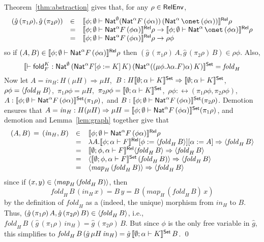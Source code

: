 \documentclass{lmcs}
\theoremstyle{plain}\newtheorem{satz}[thm]{Satz}
\newcommand{\fold}{\mathsf{fold}}
\begin{document}
{\proof
Theorem~\ref{thm:abstraction} gives that, for any 
$\rho \in \mathsf{RelEnv}$,
\[\begin{array}{lll}
(\hat{g} \,(\pi_1 \rho), \hat{g}\, (\pi_2 \rho)) & \in &
\relsem{\phi;\emptyset\vdash \Nat^{\emptyset} (\Nat^\alpha 
  F\, (\phi\alpha))\, (\Nat^\alpha\,\onet \, (\phi\alpha))}
\rho\\ 
& = & \relsem{\phi;\emptyset\vdash \Nat^\alpha F\,
  (\phi\alpha)}\rho \to \relsem{\phi;\emptyset\vdash
  \Nat^\alpha\,\onet \, (\phi\alpha)}\rho\\ 
& = & \relsem{\phi;\emptyset\vdash \Nat^\alpha F\,
  (\phi\alpha)}\rho \to \rho \phi
\end{array}\]
\noindent
so if $(A, B) \in \llbracket{\phi;\emptyset\vdash \mathsf{Nat}^\alpha F\,
  (\phi\alpha)}\rrbracket^{\mathsf{Rel}}\rho$ then $(\hat{g} \,(\pi_1 \rho)\, A, \hat{g}\, (\pi_2 \rho)\,
B) \in \rho \phi$.
Also,
\[\setsem{\vdash \fold_F^K :
  \Nat^{\emptyset}\, (\Nat^\alpha F[\phi := K]\,K)\, (\Nat^\alpha
  ((\mu \phi.\lambda\alpha.F)\alpha)\,K)} = \mathit{fold}_H\]
Now let $A = \mathit{in}_H : H (\mu H) \Rightarrow
\mu H$,\, $B : H\llbracket{\emptyset;\alpha\vdash K}\rrbracket^{\mathsf{Set}} \Rightarrow
\llbracket{\emptyset;\alpha \vdash K}\rrbracket^{\mathsf{Set}}$,\, $\rho \phi =
\langle {\mathit{fold}_H\, B} \rangle$,\, $\pi_1 \rho \phi = \mu H$,\, $\pi_2
\rho \phi = \llbracket{\emptyset;\alpha\vdash K}\rrbracket^{\mathsf{Set}}$,\, $\rho \phi :
\rel(\pi_1 \rho \phi, \pi_2 \rho \phi)$,\, $A : \llbracket{\phi;
  \emptyset \vdash \mathsf{Nat}^\alpha F \, (\phi \alpha)}\rrbracket^{\mathsf{Set}} (\pi_1 \rho)$,\,
and $B : \llbracket{\phi; \emptyset \vdash \mathsf{Nat}^\alpha F \, (\phi
  \alpha)}\rrbracket^{\mathsf{Set}} (\pi_2 \rho)$.
Demotion ensures that $A = \mathit{in}_H : H(\mu H) \Rightarrow \mu H
= \llbracket{\phi;\emptyset \vdash \mathsf{Nat}^\alpha F
  \,(\phi\alpha)}\rrbracket^{\mathsf{Set}}(\pi_1\rho)$,
and demotion and Lemma~\ref{lem:graph} together give that
\[\begin{array}{lll}
(A,B) \,=\, (\mathit{in}_H,B) & \in & \llbracket{\phi;\emptyset\vdash
  \mathsf{Nat}^\alpha F\, (\phi\alpha)}\rrbracket^{\mathsf{Rel}}\rho\\
& = & \lambda A. \llbracket{\phi;\alpha\vdash F}\rrbracket^{\mathsf{Rel}}[\phi :=
  \langle {\mathit{fold}_H\, B} \rangle][\alpha := A] \Rightarrow 
 \langle {\mathit{fold}_H\, B} \rangle \\ 
& = & \llbracket{\emptyset;\phi,\alpha\vdash F}\rrbracket^{\mathsf{Rel}}
  \langle {\mathit{fold}_H\, B} \rangle \Rightarrow \langle {\mathit{fold}_H\,
    B} \rangle\\
  & = & \langle {\llbracket{\emptyset;\phi,\alpha\vdash F}\rrbracket^{\mathsf{Set}}
    \,(\mathit{fold}_H\,B)} \rangle \Rightarrow \langle {\mathit{fold}_H\, B} \rangle\\
  & = & \langle {\mathit{map}_H \,(\mathit{fold}_H\,B)} \rangle \Rightarrow
\langle {\mathit{fold}_H\, B} \rangle\\
\end{array}\]
since if $(x,y) \in \langle {\mathit{map}_H \,(\mathit{fold}_H\,B)} \rangle$,
then $$\mathit{fold}_H\, B\, (\mathit{in}_H\,x) = B\,y = B\,
(\mathit{map}_H \,(\mathit{fold}_H\,B) \, x)$$ by the definition of
$\mathit{fold}_H$ as a (indeed, the unique) morphism from
$\mathit{in}_H$ to $B$.  Thus, $(\hat{g} \,(\pi_1 \rho)\, A,  \hat{g}\, (\pi_2
\rho)\, B) \in \langle {\mathit{fold}_H\, B} \rangle$, i.e., $\mathit{fold}_H \,
B \, (\hat{g}\, (\pi_1 \rho) \, \mathit{in}_H) = \hat{g}\,(\pi_2 \rho)\,B$.  But
since $\phi$ is the only free variable in $\hat{g}$, this simplifies to
$\mathit{fold}_H\, B \, (\hat{g}\, \mu H\, \mathit{in}_H) =
\hat{g}\,\llbracket{\emptyset;\alpha\vdash K}\rrbracket^{\mathsf{Set}}\,B$. \qed

}
\end{document}
